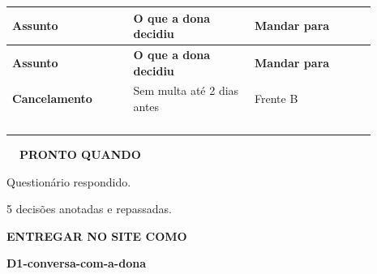 \documentclass[11pt,a4paper]{article}
\begin{document}
\begin{longtable}{>{\raggedright\arraybackslash}p{0.297\linewidth}>{\raggedright\arraybackslash}p{0.297\linewidth}>{\raggedright\arraybackslash}p{0.297\linewidth}}
\rowcolor{cor} \color{white}\textbf{\footnotesize Assunto} & \color{white}\textbf{\footnotesize O que a dona decidiu} & \color{white}\textbf{\footnotesize Mandar para} \\
\endfirsthead
\rowcolor{cor} \color{white}\textbf{\footnotesize Assunto} & \color{white}\textbf{\footnotesize O que a dona decidiu} & \color{white}\textbf{\footnotesize Mandar para} \\
\endhead
\rowcolor{white}\textbf{Cancelamento} & Sem multa até 2 dias antes & Frente B \\ \hline
\rowcolor{suave!55}\rule{0pt}{24pt} &  &  \\ \hline
\rowcolor{white}\rule{0pt}{24pt} &  &  \\ \hline
\rowcolor{suave!55}\rule{0pt}{24pt} &  &  \\ \hline
\rowcolor{white}\rule{0pt}{24pt} &  &  \\ \hline
\end{longtable}
\endgroup
\begin{lrbox}{\blocofinal}\begin{minipage}{\linewidth}
\begin{tcolorbox}[enhanced,colback=suave!45,colframe=cor!35,boxrule=0.8pt,arc=8pt,left=10pt,right=10pt,top=8pt,bottom=8pt,before skip=0pt,after skip=0pt]
\begin{minipage}[t]{0.56\linewidth}\vspace{0pt}
{\footnotesize\bfseries\color{cor}\faCheckDouble\ \ PRONTO QUANDO}\par\vspace{2pt}
\begin{checklist}
  \item Questionário respondido.
  \item 5 decisões anotadas e repassadas.
\end{checklist}
\end{minipage}\hfill
\begin{minipage}[t]{0.40\linewidth}\vspace{0pt}
\begin{selo}\centering
{\LARGE\color{cor}\faUpload}\par\vspace{3pt}
{\scriptsize\bfseries\color{cor}ENTREGAR NO SITE COMO}\par\vspace{2pt}
{\bfseries D1-conversa-com-a-dona}
\end{selo}
\end{minipage}
\end{tcolorbox}
\end{minipage}\end{lrbox}
\end{document}
